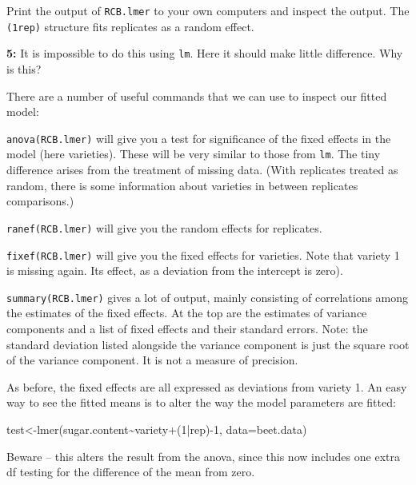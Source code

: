 \documentclass[
]{book}
\makeatletter
\newenvironment{Shaded}{\begin{snugshade}}{\end{snugshade}}
\newcommand{\AttributeTok}[1]{\textcolor[rgb]{0.77,0.63,0.00}{#1}}
\newcommand{\DecValTok}[1]{\textcolor[rgb]{0.00,0.00,0.81}{#1}}
\newcommand{\FunctionTok}[1]{\textcolor[rgb]{0.00,0.00,0.00}{#1}}
\newcommand{\NormalTok}[1]{#1}
\newcommand{\OtherTok}[1]{\textcolor[rgb]{0.56,0.35,0.01}{#1}}
\newcommand{\SpecialCharTok}[1]{\textcolor[rgb]{0.00,0.00,0.00}{#1}}
\newenvironment{kframe}{%
\medskip{}
\setlength{\fboxsep}{.8em}
 \def\at@end@of@kframe{}%
 \ifinner\ifhmode%
  \def\at@end@of@kframe{\end{minipage}}%
  \begin{minipage}{\columnwidth}%
 \fi\fi%
 \def\FrameCommand##1{\hskip\@totalleftmargin \hskip-\fboxsep
 \colorbox{shadecolor}{##1}\hskip-\fboxsep
     \hskip-\linewidth \hskip-\@totalleftmargin \hskip\columnwidth}%
 \MakeFramed {\advance\hsize-\width
   \@totalleftmargin\z@ \linewidth\hsize
   \@setminipage}}%
 {\par\unskip\endMakeFramed%
 \at@end@of@kframe}
\newenvironment{rmdblock}[1]
  {
  \begin{itemize}
  \renewcommand{\labelitemi}{
    \raisebox{-.7\height}[0pt][0pt]{
      {\setkeys{Gin}{width=3em,keepaspectratio}\texttt{[image: images/\#1]}}
    }
  }
  \setlength{\fboxsep}{1em}
  \begin{kframe}
  \item
  }
  {
  \end{kframe}
  \end{itemize}
  }
\newenvironment{rmdquiz}
  {\begin{rmdblock}{quiz}}
  {\end{rmdblock}}
\newenvironment{rmdcaution}
  {\begin{rmdblock}{caution}}
  {\end{rmdblock}}
\makeatother
\begin{document}
Print the output of \texttt{RCB.lmer} to your own computers and inspect the output. The \texttt{(1\textbar{}rep)} structure fits replicates as a random effect.

\begin{rmdquiz}
\textbf{5:}
It is impossible to do this using \texttt{lm}. Here it should make little difference. Why is this?
\end{rmdquiz}

There are a number of useful commands that we can use to inspect our fitted model:

\texttt{anova(RCB.lmer)} will give you a test for significance of the fixed effects in the model (here varieties). These will be very similar to those from \texttt{lm}. The tiny difference arises from the treatment of missing data. (With replicates treated as random, there is some information about varieties in between replicates comparisons.)

\texttt{ranef(RCB.lmer)} will give you the random effects for replicates.

\texttt{fixef(RCB.lmer)} will give you the fixed effects for varieties. Note that variety 1 is missing again. Its effect, as a deviation from the intercept is zero).

\texttt{summary(RCB.lmer)} gives a lot of output, mainly consisting of correlations among the estimates of the fixed effects. At the top are the estimates of variance components and a list of fixed effects and their standard errors. Note: the standard deviation listed alongside the variance component is just the square root of the variance component. It is not a measure of precision.

As before, the fixed effects are all expressed as deviations from variety 1. An easy way to see the fitted means is to alter the way the model parameters are fitted:

\begin{Shaded}
\begin{Highlighting}[]
\NormalTok{test}\OtherTok{\textless{}{-}}\FunctionTok{lmer}\NormalTok{(sugar.content}\SpecialCharTok{\textasciitilde{}}\NormalTok{variety}\SpecialCharTok{+}\NormalTok{(}\DecValTok{1}\SpecialCharTok{|}\NormalTok{rep)}\SpecialCharTok{{-}}\DecValTok{1}\NormalTok{,  }\AttributeTok{data=}\NormalTok{beet.data)}
\end{Highlighting}
\end{Shaded}

\begin{rmdcaution}
Beware -- this alters the result from the anova, since this now includes one extra df testing for the difference of the mean from zero.
\end{rmdcaution}
\end{document}
